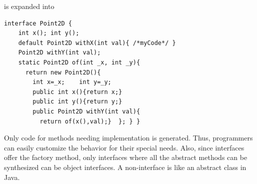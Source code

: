 \noindent is expanded into
\begin{lstlisting}
interface Point2D {
    int x(); int y();
    default Point2D withX(int val){ /*myCode*/ }
    Point2D withY(int val);
    static Point2D of(int _x, int _y){
      return new Point2D(){
        int x=_x;    int y=_y;
        public int x(){return x;}
        public int y(){return y;}
        public Point2D withY(int val){
          return of(x(),val);}  }; } }
\end{lstlisting}

\noindent Only code for methods needing implementation is generated. Thus,
programmers can easily customize the behavior for their special needs.
Also, since \mixin interfaces offer the \Q@of@ factory method, only interfaces where all the abstract methods
can be synthesized can be object interfaces. A non-\mixin interface is like an abstract class in Java.





